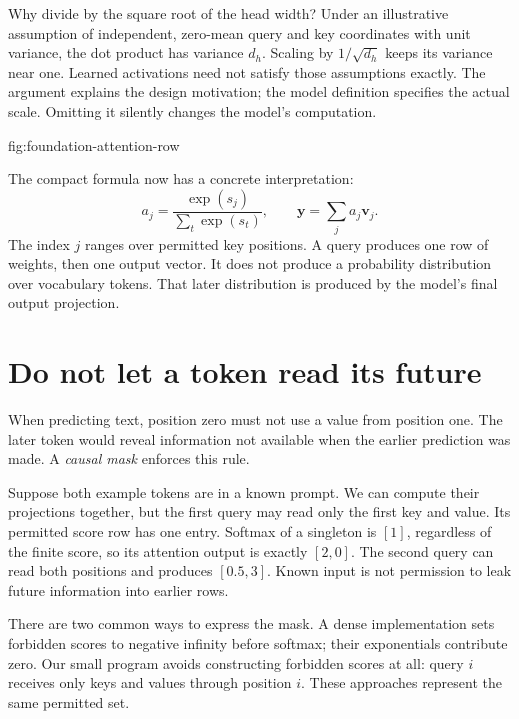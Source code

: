 Why divide by the square root of the head width? Under an illustrative
assumption of independent, zero-mean query and key coordinates with unit
variance, the dot product has variance $d_h$. Scaling by $1/\sqrt{d_h}$
keeps its variance near one. Learned activations need not satisfy those
assumptions exactly. The argument explains the design motivation; the model
definition specifies the actual scale. Omitting it silently changes the
model's computation.

{fig:foundation-attention-row}

The compact formula now has a concrete interpretation:
\[
 a_j=\frac{\exp(s_j)}{\sum_t\exp(s_t)},\qquad
 \mathbf y=\sum_j a_j\mathbf v_j.
\]
The index $j$ ranges over permitted key positions. A query produces one
row of weights, then one output vector. It does not produce a probability
distribution over vocabulary tokens. That later distribution is produced
by the model's final output projection.

\section{Do not let a token read its future}
When predicting text, position zero must not use a value from position one.
The later token would reveal information not available when the earlier
prediction was made. A \emph{causal mask} enforces this rule.

Suppose both example tokens are in a known prompt. We can compute their
projections together, but the first query may read only the first key and
value. Its permitted score row has one entry. Softmax of a singleton is
$[1]$, regardless of the finite score, so its attention output is exactly
$[2,0]$. The second query can read both positions and produces $[0.5,3]$.
Known input is not permission to leak future information into earlier rows.

There are two common ways to express the mask. A dense implementation sets
forbidden scores to negative infinity before softmax; their exponentials
contribute zero. Our small program avoids constructing forbidden scores at
all: query $i$ receives only keys and values through position $i$.
These approaches represent the same permitted set.

